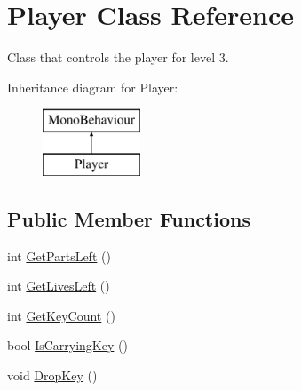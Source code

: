 \hypertarget{class_player}{\section{Player Class Reference}
\label{class_player}
}


Class that controls the player for level 3.  


Inheritance diagram for Player\-:\begin{figure}[H]
\begin{center}
\leavevmode
\includegraphics[height=2.000000cm]{class_player}
\end{center}
\end{figure}
\subsection*{Public Member Functions}
\begin{DoxyCompactItemize}
\item 
int \hyperlink{class_player_aed4d068363ffab322450dec4b674b43c}{Get\-Parts\-Left} ()
\item 
int \hyperlink{class_player_a35c51977648cc3b95a7074839a6f651a}{Get\-Lives\-Left} ()
\item 
int \hyperlink{class_player_afee1105ef952044bf9841cdaa199af0d}{Get\-Key\-Count} ()
\item 
bool \hyperlink{class_player_aa186cee2b963a62fd691f6e8f98e17ae}{Is\-Carrying\-Key} ()
\item 
void \hyperlink{class_player_a961fc1484a835f436ea9db34cd5dba7d}{Drop\-Key} ()
\end{DoxyCompactItemize}
